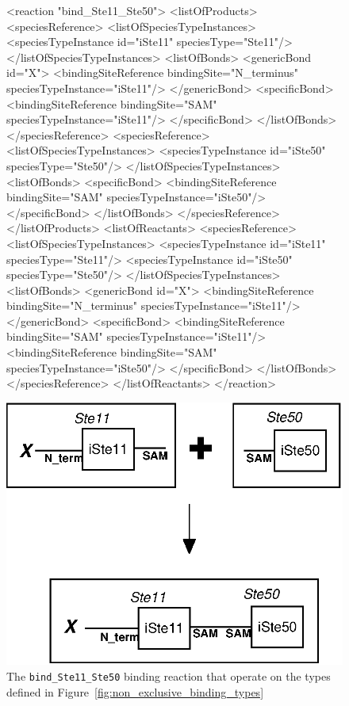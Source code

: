 \documentclass{cekarticle}
\begin{document}
\begin{figure}[h]
\begin{example}
<reaction "bind_Ste11_Ste50">
    <listOfProducts>
        <speciesReference>
            <listOfSpeciesTypeInstances>
                <speciesTypeInstance id="iSte11" speciesType="Ste11"/>
            </listOfSpeciesTypeInstances>
            <listOfBonds>
                <genericBond id="X">
                    <bindingSiteReference bindingSite="N_terminus" speciesTypeInstance="iSte11"/>
                </genericBond>
                <specificBond>
                    <bindingSiteReference bindingSite="SAM" speciesTypeInstance="iSte11"/>
                </specificBond>
            </listOfBonds>
        </speciesReference>
        <speciesReference>
            <listOfSpeciesTypeInstances>
                <speciesTypeInstance id="iSte50" speciesType="Ste50"/>
            </listOfSpeciesTypeInstances>
            <listOfBonds>
                <specificBond>
                    <bindingSiteReference bindingSite="SAM" speciesTypeInstance="iSte50"/>
                </specificBond>
            </listOfBonds>
        </speciesReference>
    </listOfProducts>
    <listOfReactants>
        <speciesReference>
            <listOfSpeciesTypeInstances>
                <speciesTypeInstance id="iSte11" speciesType="Ste11"/>
                <speciesTypeInstance id="iSte50" speciesType="Ste50"/>
            </listOfSpeciesTypeInstances>
            <listOfBonds>
                <genericBond id="X">
                    <bindingSiteReference bindingSite="N_terminus" speciesTypeInstance="iSte11"/>
                </genericBond>
                <specificBond>
                    <bindingSiteReference bindingSite="SAM" speciesTypeInstance="iSte11"/>
                    <bindingSiteReference bindingSite="SAM" speciesTypeInstance="iSte50"/>
                </specificBond>
            </listOfBonds>
        </speciesReference>
    </listOfReactants>
</reaction>
\end{example}
  \vspace*{8pt}
  \centering
  \includegraphics[scale = 0.7]{bind_Ste11_Ste50.eps}
  \caption{The \texttt{bind\_Ste11\_Ste50} binding reaction that operate on the types defined in
  Figure~\ref{fig:non_exclusive_binding_types}}
  \label{fig:bind_Ste11_Ste50}
\end{figure}
\end{document}
